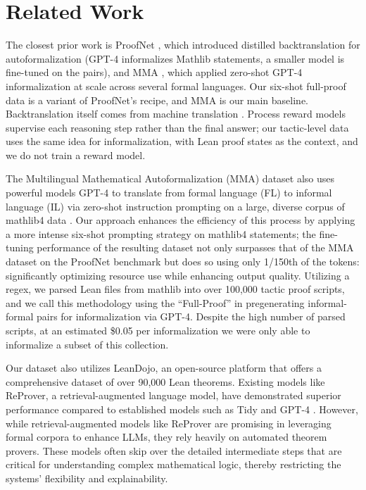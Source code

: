 \documentclass{article} %
\begin{document}
\section{Related Work}
The closest prior work is ProofNet \citep{azerbayev2023proofnet}, which introduced distilled backtranslation for autoformalization (GPT-4 informalizes Mathlib statements, a smaller model is fine-tuned on the pairs), and MMA \citep{mma}, which applied zero-shot GPT-4 informalization at scale across several formal languages. Our six-shot full-proof data is a variant of ProofNet's recipe, and MMA is our main baseline. Backtranslation itself comes from machine translation \citep{sennrich-etal-2016-improving,poncelas2018investigating}. Process reward models \citep{lightman2023lets,uesato2022solving} supervise each reasoning step rather than the final answer; our tactic-level data uses the same idea for informalization, with Lean proof states as the context, and we do not train a reward model.

The Multilingual Mathematical Autoformalization (MMA) dataset also uses powerful models GPT-4 to translate from formal language (FL) to informal language (IL) via zero-shot instruction prompting on a large, diverse corpus of mathlib4 data \citep{mma}. Our approach enhances the efficiency of this process by applying a more intense six-shot prompting strategy on mathlib4 statements; the fine-tuning performance of the resulting dataset not only surpasses that of the MMA dataset on the ProofNet benchmark but does so using only 1/150th of the tokens: significantly optimizing resource use while enhancing output quality. Utilizing a regex, we parsed Lean files from mathlib into over 100,000 tactic proof scripts, and we call this methodology using the “Full-Proof” in pregenerating informal-formal pairs for informalization via GPT-4. Despite the high number of parsed scripts, at an estimated \$0.05 per informalization we were only able to informalize a subset of this collection.

Our dataset also utilizes LeanDojo, an open-source platform that offers a comprehensive dataset of over 90,000 Lean theorems. Existing models like ReProver, a retrieval-augmented language model, have demonstrated superior performance compared to established models such as Tidy and GPT-4 \citep{Leandojo}. However, while retrieval-augmented models like ReProver are promising in leveraging formal corpora to enhance LLMs, they rely heavily on automated theorem provers. These models often skip over the detailed intermediate steps that are critical for understanding complex mathematical logic, thereby restricting the systems' flexibility and explainability.
\end{document}
